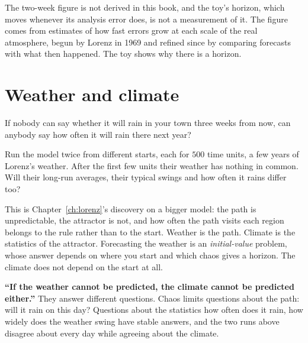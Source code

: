 \begin{rigourbox}
The two-week figure is not derived in this book, and the toy's horizon, which
moves whenever its analysis error does, is not a measurement of it. The
figure comes from estimates of how fast errors grow at each scale of the
real atmosphere, begun by Lorenz in 1969 and refined since by comparing
forecasts with what then happened. The toy shows why there is a horizon.
\end{rigourbox}

\section{Weather and climate}
\label{sec:ch14-climate}

\noindent
If nobody can say whether it will rain in your town three weeks from now,
can anybody say how often it will rain there next year?

\begin{think}
Run the model twice from different starts, each for $500$ time units, a few
years of Lorenz's weather. After the first few units their weather has
nothing in common. Will their long-run averages, their typical swings and
how often it rains differ too?
\end{think}



\noindent
This is Chapter~\ref{ch:lorenz}'s discovery on a bigger model: the path is
unpredictable, the attractor is not, and how often the path visits each
region belongs to the rule rather than to the start. Weather is the path.
Climate is the statistics of the attractor. Forecasting the weather is an
\emph{initial-value} problem, whose answer depends on where you start and
which chaos gives a horizon. The climate does not depend on the start at all.

\begin{trapbox}
\textbf{\enquote{If the weather cannot be predicted, the climate cannot be
predicted either.}} They answer different questions. Chaos limits questions
about the path: will it rain on this day? Questions about the statistics
\dash{} how often does it rain, how widely does the weather swing \dash{} have
stable answers, and the two runs above disagree about every day while
agreeing about the climate.
\end{trapbox}

